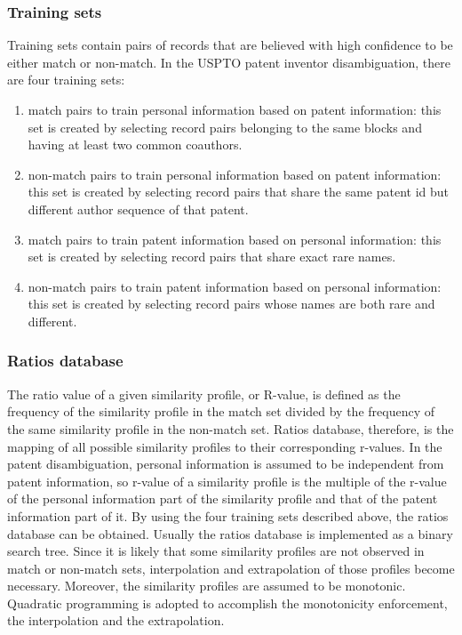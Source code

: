\documentclass{article}
\begin{document}
\subsubsection{Training sets}

Training sets contain pairs of records that are believed 
with high confidence to be either match or
non-match. In the USPTO patent inventor disambiguation, 
there are four training sets:

\begin{enumerate}

\item match pairs to train personal information based 
on patent information: this set is created by selecting 
record pairs belonging to the same blocks and having at 
least two common coauthors.

\item non-match pairs to train personal information based 
on patent information: this set is created by
selecting record pairs that share the same patent id but 
different author sequence of that patent.

\item match pairs to train patent information based on 
personal information: this set is created by
selecting record pairs that share exact rare names.

\item non-match pairs to train patent information based on 
personal information: this set is created by
selecting record pairs whose names are both rare and different.

\end{enumerate}


\subsubsection{Ratios database}


The ratio value of a given similarity profile, or R-value, 
is defined as the frequency of the similarity profile in the 
match set divided by the frequency of the same similarity 
profile in the non-match set. Ratios database, therefore, 
is the mapping of all possible similarity profiles to 
their corresponding r-values. In the patent disambiguation, 
personal information is assumed to be independent from patent
information, so r-value of a similarity profile is the 
multiple of the r-value of the personal information
part of the similarity profile and that of the patent 
information part of it. By using the four training sets
described above, the ratios database can be obtained. Usually 
the ratios database is implemented as a binary search tree. 
Since it is likely that some similarity profiles are not 
observed in match or non-match sets, interpolation and 
extrapolation of those profiles become necessary. Moreover, the
similarity profiles are assumed to be monotonic. Quadratic 
programming is adopted to accomplish the monotonicity 
enforcement, the interpolation and the extrapolation.
\end{document}
